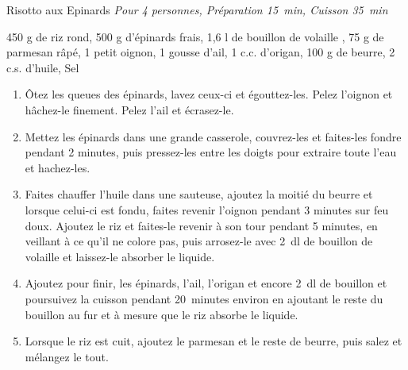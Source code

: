 \begin{recette}{Risotto aux Epinards}
  \emph{Pour 4 personnes,	Préparation 15~min, Cuisson 35~min}
  \begin{ingredients}
    450 g de riz rond\sep
    500 g d'épinards frais\sep
    1,6 l de bouillon de volaille \sep
    75 g de parmesan râpé\sep
    1 petit oignon\sep
    1 gousse d’ail\sep
    1 c.c. d'origan\sep
    100 g de beurre\sep
    2 c.s. d'huile\sep
    Sel
  \end{ingredients}

	\begin{enumerate}
	\item Ôtez les queues des épinards, lavez ceux-ci et égouttez-les. Pelez l’oignon et hâchez-le finement. Pelez l’ail et écrasez-le.
  \item Mettez les épinards dans une grande casserole, couvrez-les et faites-les fondre pendant 2 minutes, puis pressez-les entre les doigts pour extraire toute l’eau et hachez-les.
  \item Faites chauffer l’huile dans une sauteuse, ajoutez la moitié du beurre et lorsque celui-ci est fondu, faites revenir l'oignon pendant 3 minutes sur feu doux. Ajoutez le riz et faites-le revenir à son tour pendant 5 minutes, en veillant à ce qu’il ne colore pas, puis arrosez-le avec 2~dl de bouillon de volaille et laissez-le absorber le liquide.
  \item Ajoutez pour finir, les épinards, l’ail, l’origan et encore 2~dl de bouillon et poursuivez la cuisson pendant 20~minutes environ en ajoutant le reste du bouillon au fur et à mesure que le riz absorbe le liquide.
  \item Lorsque le riz est cuit, ajoutez le parmesan et le reste de beurre, puis salez et mélangez le tout.
  \end{enumerate}
\end{recette}
